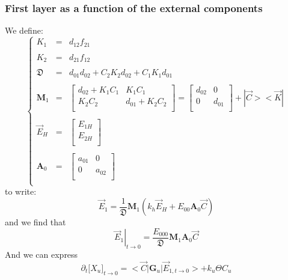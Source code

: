 \documentclass[aps,onecolumn,11pt]{revtex4}
\newcommand{\myconc}[1]{\big[#1\big]}
\newcommand{\mymat}[1]{{\bm{#1}}}
\begin{document}
\subsubsection{First layer as a function of the external components}
We define:
\begin{equation}
\left\lbrace
\begin{array}{rcl}
K_1 & = & d_{12} f_{21} \\
\\
K_2 & = &  d_{21} f_{12}\\
\\
\mathfrak{D} & = & d_{01} d_{02}+ C_2 K_2 d_{02}+C_1K_1 d_{01}\\
\\
\mymat{M}_1  & = &  \begin{bmatrix}
   d_{02} + K_1 C_1 & K_1 C_1 \\
   K_2C_2 & d_{01} + K_2 C_2 \\
 \end{bmatrix} =  \begin{bmatrix}
   d_{02}  &  0 \\
   0  & d_{01}   \\
   \end{bmatrix} + |\vec{C}><\vec{K}|
\\
\\
\vec{E}_H & = & \begin{bmatrix}
 E_{1H}\\
 E_{2H}\\
 \end{bmatrix}\\
 \\
 \mymat{A}_0 & = & \begin{bmatrix}
 a_{01} & 0 \\
 0 & a_{02}\\
 \end{bmatrix}\\
\end{array}
\right.
\end{equation}
to write:
\begin{equation}
\boxed{
	\vec{E}_1 =  \dfrac{1}{ \mathfrak{D} }
	\mymat{M}_1	
 \left(
k_h 
 \vec{E}_H
 +E_{00} 
 \mymat{A}_0
 \vec{C}
\right)
}
\end{equation}
and we find that
\begin{equation}
\left.\vec{E}_1\right\vert_{t\to0} =  \dfrac{E_{000}}{ \mathfrak{D} }
	\mymat{M}_1	
 \mymat{A}_0
 \vec{C}
\end{equation}
And we can express
\begin{equation}
	\partial_t \myconc{X_u}_{t\to0}  =   	<\vec{C}|\mymat{G}_u|\vec{E}_{1,t\to0}> + k_u\Theta C_u 
\end{equation}
\end{document}
